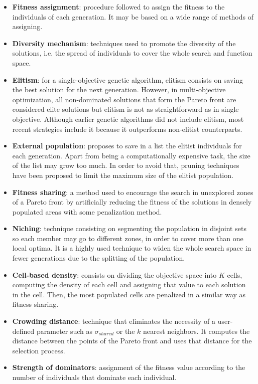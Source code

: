     \begin{itemize}[label={--}]
        \item \textbf{Fitness assignment}: procedure followed to assign the fitness to the individuals of each generation. It may be based on a wide range of methods of assigning.
        \item \textbf{Diversity mechanism}: techniques used to promote the diversity of the solutions, i.e. the spread of individuals to cover the whole search and function space.
        
        \newpage
        
        \item \textbf{Elitism}: for a single-objective genetic algorithm, elitism consists on saving the best solution for the next generation. However, in multi-objective optimization, all non-dominated solutions that form the Pareto front are considered elite solutions but elitism is not as straightforward as in single objective. Although earlier genetic algorithms did not include elitism, most recent strategies include it because it outperforms non-elitist counterparts.
        \item \textbf{External population}: proposes to save in a list the elitist individuals for each generation. Apart from being a computationally expensive task, the size of the list may grow too much. In order to avoid that, pruning techniques have been proposed to limit the maximum size of the elitist population.
        \item \textbf{Fitness sharing}: a method used to encourage the search in unexplored zones of a Pareto front by artificially reducing the fitness of the solutions in densely populated areas with some penalization method.
        \item \textbf{Niching}: technique consisting on segmenting the population in disjoint sets so each member may go to different zones, in order to cover more than one local optima. It is a highly used technique to widen the whole search space in fewer generations due to the splitting of the population.
        \item \textbf{Cell-based density}: consists on dividing the objective space into $K$ cells, computing the density of each cell and assigning that value to each solution in the cell. Then, the most populated cells are penalized in a similar way as fitness sharing.
        \item \textbf{Crowding distance}: technique that eliminates the necessity of a user-defined parameter such as $\sigma_{shared}$ or the $k$ nearest neighbors. It computes the distance between the points of the Pareto front and uses that distance for the selection process.
        \item \textbf{Strength of dominators}: assignment of the fitness value according to the number of individuals that dominate each individual.
    \end{itemize}
    
